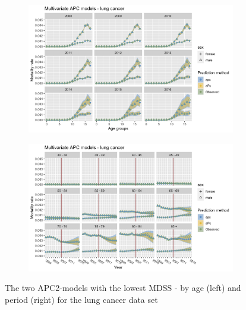 \begin{figure}[h!]
    \centering
    \begin{subfigure}[b]{.45\linewidth}
        \includegraphics[width=\linewidth]{real-data/real-data-multivariate/Figures/multivariate-APC-by-age-lung.png}
    \end{subfigure}
    \begin{subfigure}[b]{.45\linewidth}
        \includegraphics[width=\linewidth]{real-data/real-data-multivariate/Figures/multivariate-APC-by-period-lung.png}
    \end{subfigure}
    \caption{The two APC2-models with the lowest MDSS - by age (left) and period (right) for the lung cancer data set}
    \label{fig:mv-APC-lung}
\end{figure}

